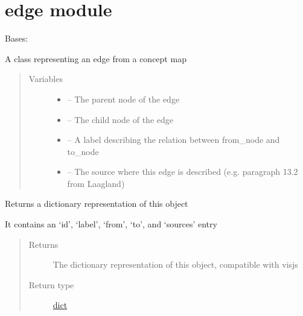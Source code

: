 \documentclass[letterpaper,10pt,english]{sphinxmanual}
\begin{document}
\section{edge module}
\label{\detokenize{edge:edge-module}}\label{\detokenize{edge:module-edge}}\label{\detokenize{edge::doc}}

\begin{fulllineitems}
\label{\detokenize{edge:edge.Edge}}
Bases: 

A class representing an edge from a concept map
\begin{quote}\begin{description}
\item[{Variables}] \leavevmode\begin{itemize}
\item {} 
 -- The parent node of the edge

\item {} 
 -- The child node of the edge

\item {} 
 -- A label describing the relation between from\_node and to\_node

\item {} 
 -- The source where this edge is described (e.g. paragraph 13.2 from Laagland)

\end{itemize}

\end{description}\end{quote}

\begin{fulllineitems}
\label{\detokenize{edge:edge.Edge.to_dict}}
Returns a dictionary representation of this object

It contains an `id', `label', `from', `to', and `sources' entry
\begin{quote}\begin{description}
\item[{Returns}] \leavevmode
The dictionary representation of this object, compatible with visjs

\item[{Return type}] \leavevmode
\href{https://docs.python.org/2/library/stdtypes.html\#dict}{dict}

\end{description}\end{quote}

\end{fulllineitems}


\end{fulllineitems}
\end{document}
